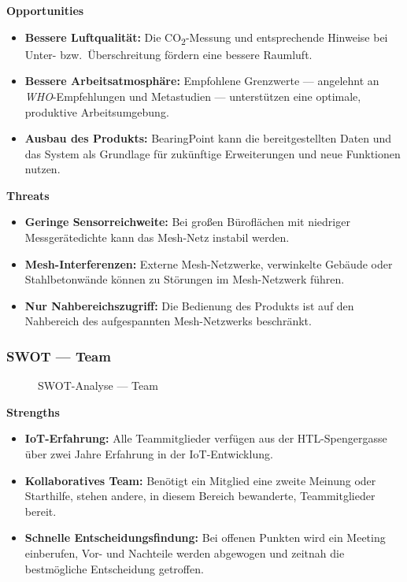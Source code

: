 \documentclass{article}
\begin{document}
\pagebreak
\noindent\textbf{Opportunities}
\begin{itemize}
  \item \textbf{Bessere Luftqualität:} Die CO\textsubscript{2}-Messung und entsprechende Hinweise bei Unter- bzw.\ Überschreitung fördern eine bessere Raumluft.
  \item \textbf{Bessere Arbeitsatmosphäre:} Empfohlene Grenzwerte — angelehnt an \emph{WHO}-Empfehlungen und Metastudien — unterstützen eine optimale, produktive Arbeitsumgebung.
  \item \textbf{Ausbau des Produkts:} BearingPoint kann die bereitgestellten Daten und das System als Grundlage für zukünftige Erweiterungen und neue Funktionen nutzen.
\end{itemize}

\noindent\textbf{Threats}
\begin{itemize}
  \item \textbf{Geringe Sensorreichweite:} Bei großen Büroflächen mit niedriger Messgerätedichte kann das Mesh-Netz instabil werden.
  \item \textbf{Mesh-Interferenzen:} Externe Mesh-Netzwerke, verwinkelte Gebäude oder Stahlbetonwände können zu Störungen im Mesh-Netzwerk führen.
  \item \textbf{Nur Nahbereichszugriff:} Die Bedienung des Produkts ist auf den Nahbereich des aufgespannten Mesh-Netzwerks beschränkt.
\end{itemize}


\subsubsection{SWOT — Team}
\begin{figure}[H]
  \centering
  
  \caption{SWOT-Analyse — Team}
  \label{fig:swot-team}
\end{figure}

\pagebreak
\noindent\textbf{Strengths}
\begin{itemize}
  \item \textbf{IoT-Erfahrung:} Alle Teammitglieder verfügen aus der HTL-Spengergasse über zwei Jahre Erfahrung in der IoT-Entwicklung.
  \item \textbf{Kollaboratives Team:} Benötigt ein Mitglied eine zweite Meinung oder Starthilfe, stehen andere, in diesem Bereich bewanderte, Teammitglieder bereit.
  \item \textbf{Schnelle Entscheidungsfindung:} Bei offenen Punkten wird ein Meeting einberufen, Vor- und Nachteile werden abgewogen und zeitnah die bestmögliche Entscheidung getroffen.
\end{itemize}
\end{document}

